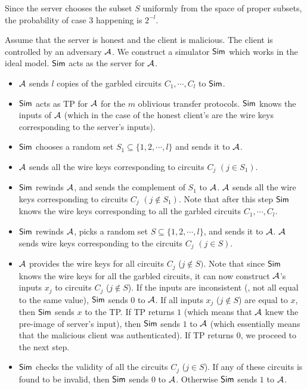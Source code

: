 Since the server chooses the subset $S$ uniformly from the space of
proper subsets, the probability of case 3 happening is $2^{-l}$.

Assume that the server is honest and the
client is malicious. The client is controlled by an
adversary ${\cal A}$. We construct a simulator ${\sf Sim}$ which works
in the ideal model. ${\sf Sim}$ acts as the server for ${\cal A}$.
\begin{itemize}
\item ${\cal A}$ sends $l$ copies of the garbled circuits $C_1,\cdots,C_l$ to ${\sf Sim}$.
\item ${\sf Sim}$ acts as TP for ${\cal A}$ for the $m$ oblivious transfer protocols. ${\sf Sim}$ knows the
inputs of ${\cal A}$ (which in the case of the honest client's are the wire keys corresponding to the 
server's inputs).
\item ${\sf Sim}$ chooses a random set $S_1 \subseteq \{ 1,2, \cdots, l \}$ and sends it to ${\cal A}$.

\item ${\cal A}$ sends all the wire keys corresponding to circuits $C_j$ $(j \in S_1)$.

\item ${\sf Sim}$ rewinds ${\cal A}$, and sends the complement of $S_1$ to ${\cal A}$. 
${\cal A}$ sends all the wire keys corresponding to circuits $C_j$ $(j \not\in S_1)$. Note that after this
step ${\sf Sim}$ knows the wire keys corresponding to all the garbled circuits $C_1,\cdots,C_l$.

\item ${\sf Sim}$ rewinds ${\cal A}$, picks a random set $S \subseteq \{ 1,2,\cdots, l \}$, and
sends it to ${\cal A}$. ${\cal A}$ sends wire keys corresponding to the circuits $C_j$ $(j \in S)$. 

\item ${\cal A}$ provides the wire keys for all circuits $C_j$ ($j \not\in S)$. Note that since ${\sf Sim}$
knows the wire keys for all the garbled circuits, it can now construct ${\cal A}$'s inputs $x_j$ to
circuits $C_j$ ($j \not\in S$). If the inputs are inconsistent
(\ie, not all equal to the same value), ${\sf Sim}$ sends $0$ to
${\cal A}$. If all inputs $x_j$ ($j \not\in S$) are equal to $x$, then ${\sf Sim}$ sends
$x$ to the TP. If TP returns $1$ (which means that ${\cal A}$ knew the pre-image of server's input), then
${\sf Sim}$ sends $1$ to ${\cal A}$ (which essentially means that the malicious client was authenticated). 
If TP returns $0$, we proceed to the next step.

\item ${\sf Sim}$ checks the validity of all the circuits $C_j$ ($j \in S$). If any of these circuits is found to be invalid,
then ${\sf Sim}$ sends $0$ to ${\cal A}$. Otherwise ${\sf Sim}$ sends $1$ to ${\cal A}$.
\end{itemize}

